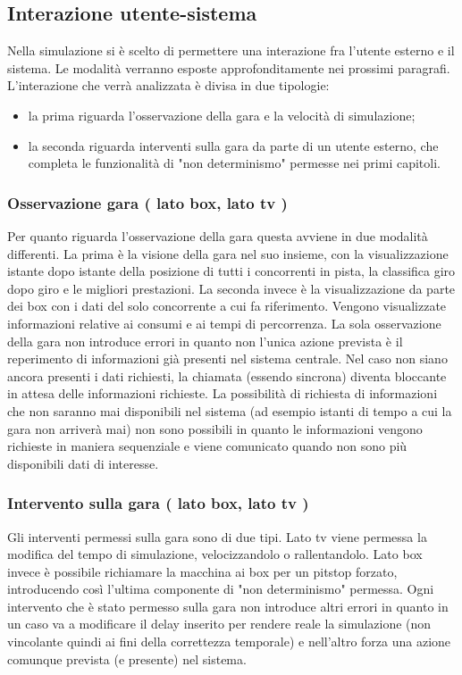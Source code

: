 \subsection{Interazione utente-sistema}
Nella simulazione si è scelto di permettere una interazione fra l'utente esterno
e il sistema. Le modalità verranno esposte approfonditamente nei prossimi
paragrafi. L'interazione che verrà analizzata è divisa in due tipologie:
\begin{itemize}
\item la
prima riguarda l'osservazione della gara e la velocità di simulazione;
\item la
seconda  riguarda interventi sulla gara da parte di un utente esterno,
che completa le funzionalità di "non determinismo" permesse nei primi capitoli.
\end{itemize}
\subsubsection{Osservazione gara ( lato box, lato tv )}
Per quanto riguarda l'osservazione della gara questa avviene in due modalità
differenti. La prima è la visione della gara nel suo insieme, con la
visualizzazione istante dopo istante della posizione di tutti i concorrenti in
pista, la classifica giro dopo giro e le migliori prestazioni. La seconda invece
è la visualizzazione da parte dei box con i dati del solo concorrente a cui fa
riferimento. Vengono visualizzate informazioni relative ai consumi e ai tempi di
percorrenza. La sola osservazione della gara non introduce errori in quanto non
l'unica azione prevista è il reperimento di informazioni già presenti nel
sistema centrale. Nel caso non siano ancora presenti i dati richiesti, la
chiamata (essendo sincrona) diventa bloccante in attesa delle informazioni
richieste. La possibilità di richiesta di informazioni che non saranno mai
disponibili nel sistema (ad esempio istanti di tempo a cui la gara non arriverà
mai) non sono possibili in quanto le informazioni vengono richieste in
maniera sequenziale e viene comunicato quando non sono più disponibili dati di
interesse.
\subsubsection{Intervento sulla gara ( lato box, lato tv )}
Gli interventi permessi sulla gara sono di due tipi. Lato tv
viene permessa la modifica del tempo di simulazione, velocizzandolo o
rallentandolo. Lato box invece è possibile richiamare la macchina ai box per un
pitstop forzato, introducendo così l'ultima componente di "non determinismo"
permessa.
Ogni intervento che è stato permesso sulla gara non introduce altri errori in
quanto in un caso va a modificare il delay inserito per rendere reale la
simulazione (non vincolante quindi ai fini della correttezza temporale)
e nell'altro forza una azione comunque prevista (e presente) nel
sistema. 
